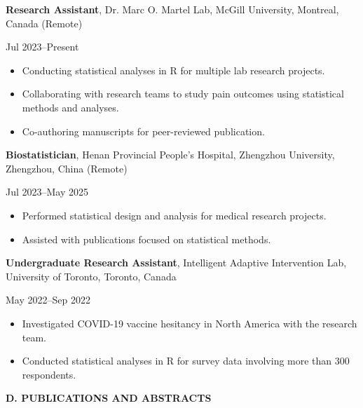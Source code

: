 \documentclass[10pt]{article}
\newcommand{\cvsection}[1]{%
  \Needspace{5\baselineskip}%
  \vspace{0.65em}%
  {\large\bfseries\color{sectiongray} #1}\par
  \vspace{0.18em}%
}
\newcommand{\cvdated}[2]{%
  \noindent
  \begin{minipage}[t]{\dimexpr\linewidth-1.35in\relax}
    \raggedright\strut #1\strut
  \end{minipage}%
  \hfill
  \begin{minipage}[t]{1.18in}
    \raggedleft\strut{\color{dategray} #2}%
  \end{minipage}\par
}
\newenvironment{cvdetailitems}{%
  \begin{itemize}[leftmargin=1.6em,label=--,topsep=0.06em,itemsep=0.12em,parsep=0pt,partopsep=0pt,after=\vspace{0.08em}]
}{%
  \end{itemize}%
}
\newcommand{\cvresearchentry}[2]{%
  \Needspace{5\baselineskip}%
  \cvdated{#1}{#2}%
}
\begin{document}
\cvresearchentry{\textbf{Research Assistant}, Dr. Marc O. Martel Lab, McGill University, Montreal, Canada (Remote)}{Jul 2023--Present}
\begin{cvdetailitems}
\item Conducting statistical analyses in R for multiple lab research projects.
\item Collaborating with research teams to study pain outcomes using statistical methods and analyses.
\item Co-authoring manuscripts for peer-reviewed publication.
\end{cvdetailitems}

\cvresearchentry{\textbf{Biostatistician}, Henan Provincial People's Hospital, Zhengzhou University, Zhengzhou, China (Remote)}{Jul 2023--May 2025}
\begin{cvdetailitems}
\item Performed statistical design and analysis for medical research projects.
\item Assisted with publications focused on statistical methods.
\end{cvdetailitems}

\cvresearchentry{\textbf{Undergraduate Research Assistant}, Intelligent Adaptive Intervention Lab, University of Toronto, Toronto, Canada}{May 2022--Sep 2022}
\begin{cvdetailitems}
\item Investigated COVID-19 vaccine hesitancy in North America with the research team.
\item Conducted statistical analyses in R for survey data involving more than 300 respondents.
\end{cvdetailitems}

\cvsection{D. PUBLICATIONS AND ABSTRACTS}
\end{document}
